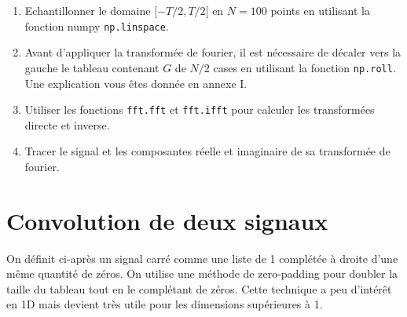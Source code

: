 \documentclass[a4paper, 12pt]{article}
\begin{document}
\begin{enumerate} 
\item Echantillonner le domaine $ [-T/2, T/2[$ en $N=100$ points en utilisant la fonction numpy
{\tt np.linspace}. 
\item Avant d'appliquer la transformée de fourier, il est nécessaire de décaler vers la gauche
le tableau contenant $G$ de $N/2$ cases en utilisant la fonction {\tt np.roll}.
Une explication vous êtes donnée en annexe I.

%
%


%
%

\item Utiliser les fonctions {\tt fft.fft} et {\tt fft.ifft} pour calculer 
les transformées directe et inverse.
\item Tracer le signal et les composantes réelle et imaginaire de sa transformée de fourier.
\end{enumerate} 

\section{Convolution de deux signaux}
 
 On définit ci-après un signal carré comme une liste de 1 complétée à droite d'une même quantité de zéros.
On utilise une méthode de zero-padding pour doubler la taille du tableau tout en le complétant de zéros. 
Cette technique a peu d'intérêt en 1D mais devient très utile pour les dimensions supérieures à 1.
 
\end{document}
